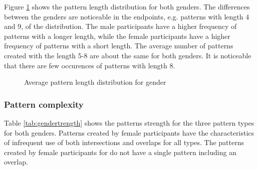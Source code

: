     Figure \ref{fig:avgpatterndistgender} shows the pattern length distribution for both genders. The differences between the genders are noticeable in the endpoints, e.g. patterns with length 4 and 9, of the distribution. The male participants have a higher frequency of patterns with a longer length, while the female participants have a higher frequency of patterns with a short length. The average number of patterns created with the length 5-8 are about the same for both genders. It is noticeable that there are few occurences of patterns with length 8. 

    \begin{figure}[H]
    	\centering
    	\caption{Average pattern length distribution for gender}
    	\label{fig:avgpatterndistgender}
    \end{figure}

    \subsubsection{Pattern complexity}

    Table \ref{tab:gendertrength} shows the patterns strength for the three pattern types for both genders. Patterns created by female participants have the characteristics of infrequent use of both intersections and overlaps for all types. The patterns created by female participants for do not have a single pattern including an overlap.

